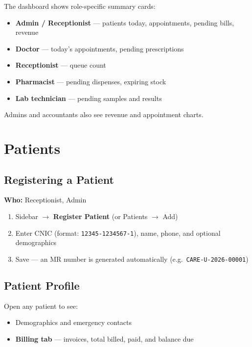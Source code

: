 \documentclass[11pt,a4paper]{report}
\begin{document}
The dashboard shows role-specific summary cards:

\begin{itemize}[noitemsep]
    \item \textbf{Admin / Receptionist} --- patients today, appointments, pending bills, revenue
    \item \textbf{Doctor} --- today's appointments, pending prescriptions
    \item \textbf{Receptionist} --- queue count
    \item \textbf{Pharmacist} --- pending dispenses, expiring stock
    \item \textbf{Lab technician} --- pending samples and results
\end{itemize}

Admins and accountants also see revenue and appointment charts.

\chapter{Patients}

\section{Registering a Patient}

\textbf{Who:} Receptionist, Admin

\begin{enumerate}[noitemsep]
    \item Sidebar $\rightarrow$ \textbf{Register Patient} (or Patients $\rightarrow$ Add)
    \item Enter CNIC (format: \texttt{12345-1234567-1}), name, phone, and optional demographics
    \item Save --- an MR number is generated automatically (e.g.\ \texttt{CARE-U-2026-00001})
\end{enumerate}

\section{Patient Profile}

Open any patient to see:
\begin{itemize}[noitemsep]
    \item Demographics and emergency contacts
    \item \textbf{Billing tab} --- invoices, total billed, paid, and balance due
\end{itemize}
\end{document}
